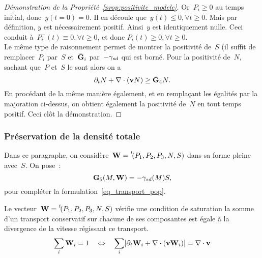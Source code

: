 \documentclass[main.tex]{subfiles}
\begin{document}
\begin{proof}[Démonstration de la Propriété~\ref{prop:positivite_modele}]
Or~$P_i\geq 0$ au temps initial, donc~$y(t=0)=0$. Il en découle que~$y(t)\leq0, \forall t\geq0$. Mais par définition, $y$ est nécessairement positif. Ainsi~$y$ est identiquement nulle. Ceci conduit à~$P_i^-(t)\equiv0, \forall t\geq0$, et donc $P_i(t)\geq0, \forall t\geq0$. \\
Le même type de raisonnement permet de montrer la positivité de~$S$ (il suffit de remplacer~$P_i$ par~$S$ et~$\bar{{\bf G}}_i$ par~$-\gamma_{sd}$ qui est borné. Pour la positivité de~$N$, sachant que~$P$ et~$S$ le sont alors on a
$$ \partial_t N + \nabla\cdot (\mathbf{v} N) \geq \bar{{\bf G}}_4 N.$$
En procédant de la même manière également, et en remplaçant les égalités par la majoration ci-dessus, on obtient également la positivité de~$N$ en tout temps positif. Ceci clôt la démonstration.
\end{proof}


\subsubsection{Préservation de la densité totale}
Dans ce paragraphe, on considère~${\bf W}=\prescript{\mathit{t\!}}{}{(P_1, P_2, P_3, N, S)}$ dans sa forme pleine \ie avec~$S$. On pose~:
\begin{equation}\label{eq:G5}
{\bf G}_5(M,{\bf W}) = -\gamma_{sd}(M) S,
\end{equation}
pour compléter la formulation~\eqref{eq_transport_pop}.
\begin{prop}
Le vecteur~${\bf W}=\prescript{\mathit{t\!}}{}{(P_1, P_2, P_3, N, S)}$ vérifie une condition de saturation \ssi la somme d'un transport conservatif sur chacune de ses composantes est égale à la divergence de la vitesse régissant ce transport.
\begin{equation}
\sum_i {\bf W}_i = 1 \quad \Leftrightarrow \quad \sum_i  [ \partial_t {\bf W}_i + \nabla\cdot(\mathbf{v}{\bf W}_i) ] = \nabla\cdot \mathbf{v}
\end{equation}
\end{prop}
\end{document}
